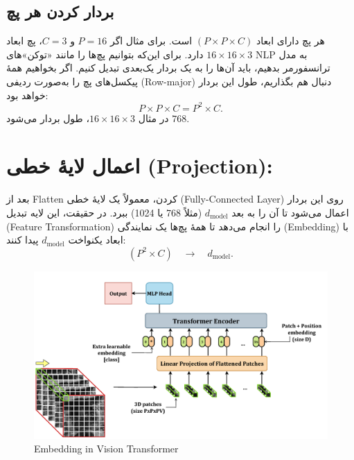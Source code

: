 \subsection{بردار کردن هر پچ}

هر پچ دارای ابعاد \((P \times P \times C)\) است. برای مثال اگر \(P = 16\) و \(C = 3\)، پچ ابعاد \(16 \times 16 \times 3\) دارد.
برای این‌که بتوانیم پچ‌ها را مانند «توکن»‌های NLP به مدل ترانسفورمر بدهیم، باید آن‌ها را به یک بردار یک‌بعدی تبدیل کنیم.
اگر بخواهیم همهٔ پیکسل‌های پچ را به‌صورت ردیفی (Row-major) دنبال هم بگذاریم، طول این بردار خواهد بود:
\[
P \times P \times C = P^2 \times C.
\]
در مثال \(16 \times 16 \times 3\)، طول بردار می‌شود \(768\).

\section{اعمال لایهٔ خطی (Projection):}


بعد از Flatten کردن، معمولاً یک لایهٔ خطی (Fully-Connected Layer) روی این بردار اعمال می‌شود تا آن را به بعد \(d_{\text{model}}\) (مثلاً 768 یا 1024) ببرد.
در حقیقت، این لایه تبدیل  (Feature Transformation) را  انجام می‌دهد تا همهٔ پچ‌ها یک نمایندگی (Embedding) با ابعاد یکنواخت \(d_{\text{model}}\) پیدا کنند:
\[
(P^2 \times C) \quad \rightarrow \quad d_{\text{model}}.
\]



\begin{figure}[h]
	\centering
	\begin{minipage}[b]{0.9\textwidth}
		\centering
		\includegraphics[width=\textwidth]{transformer_images/vision_transformer_embedding.png}
		\caption{Embedding in Vision Transformer}
		\label{fig:Embedding Vision Transformer}
	\end{minipage}
	\hfill
	
\end{figure}




